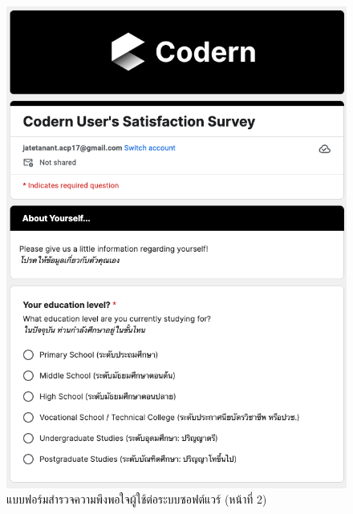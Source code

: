 \documentclass[12pt,one side,openright,a4paper]{cpe-thesis-th}
\begin{document}
\begin{figure}[H]
    \centering
    \includegraphics[width=15cm]{figure/results/forms/survey-google-p2-1.png}
    \caption[แบบฟอร์มสำรวจความพึงพอใจผู้ใช้ต่อระบบซอฟต์แวร์ (หน้าที่ 2)]{แบบฟอร์มสำรวจความพึงพอใจผู้ใช้ต่อระบบซอฟต์แวร์ (หน้าที่ 2)}
\end{figure}
\end{document}
